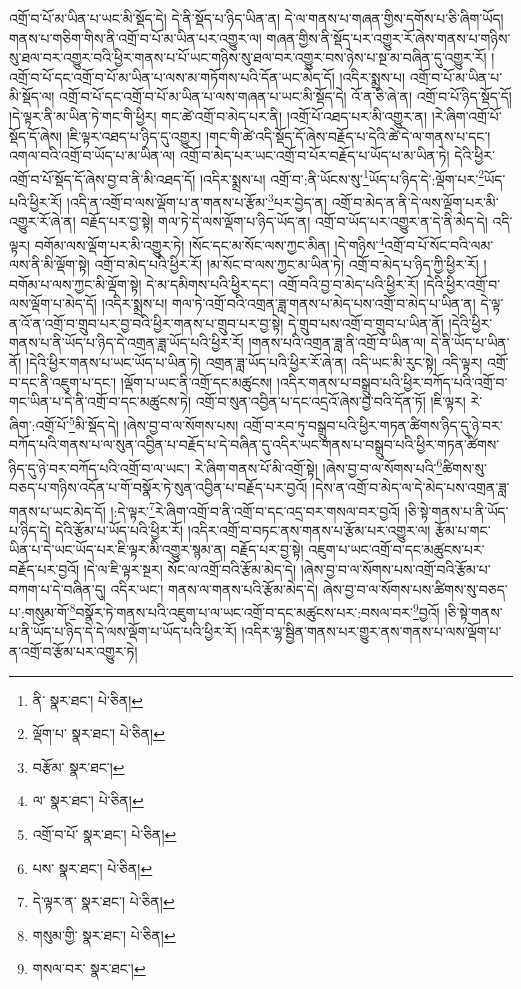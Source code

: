 འགྲོ་བ་པོ་མ་ཡིན་པ་ཡང་མི་སྡོད་དེ། དེ་ནི་སྡོད་པ་ཉིད་ཡིན་ན། དེ་ལ་གནས་པ་གཞན་གྱིས་དགོས་པ་ཅི་ཞིག་ཡོད། གནས་པ་གཅིག་གིས་ནི་འགྲོ་བ་པོ་མ་ཡིན་པར་འགྱུར་ལ། གཞན་གྱིས་ནི་སྡོད་པར་འགྱུར་རོ་ཞེས་གནས་པ་གཉིས་སུ་ཐལ་བར་འགྱུར་བའི་ཕྱིར་གནས་པ་པོ་ཡང་གཉིས་སུ་ཐལ་བར་འགྱུར་བས་ཉེས་པ་སྔ་མ་བཞིན་དུ་འགྱུར་རོ། །འགྲོ་བ་པོ་དང་འགྲོ་བ་པོ་མ་ཡིན་པ་ལས་མ་གཏོགས་པའི་དོན་ཡང་མེད་དོ། །འདིར་སྨྲས་པ། འགྲོ་བ་པོ་མ་ཡིན་པ་མི་སྡོད་ལ། འགྲོ་བ་པོ་དང་འགྲོ་བ་པོ་མ་ཡིན་པ་ལས་གཞན་པ་ཡང་མི་སྡོད་དེ། འོ་ན་ཅི་ཞེ་ན། འགྲོ་བ་པོ་ཉིད་སྡོད་དོ། །དེ་ལྟར་ནི་མ་ཡིན་ཏེ་གང་གི་ཕྱིར། གང་ཚེ་འགྲོ་བ་མེད་པར་ནི། །འགྲོ་པོ་འཐད་པར་མི་འགྱུར་ན། །རེ་ཞིག་འགྲོ་པོ་སྡོད་དོ་ཞེས། །ཇི་ལྟར་འཐད་པ་ཉིད་དུ་འགྱུར། །གང་གི་ཚེ་འདི་སྡོད་དོ་ཞེས་བརྗོད་པ་དེའི་ཚེ་དེ་ལ་གནས་པ་དང་། འགལ་བའི་འགྲོ་བ་ཡོད་པ་མ་ཡིན་ལ། འགྲོ་བ་མེད་པར་ཡང་འགྲོ་བ་པོར་བརྗོད་པ་ཡོད་པ་མ་ཡིན་ཏེ། དེའི་ཕྱིར་འགྲོ་བ་པོ་སྡོད་དོ་ཞེས་བྱ་བ་ནི་མི་འཐད་དོ། །འདིར་སྨྲས་པ། འགྲོ་བ་:ནི་ཡོངས་སུ་\footnote{ནི་  སྣར་ཐང་།  པེ་ཅིན། }ཡོད་པ་ཉིད་དེ་:ལྡོག་པར་\footnote{ལྡོག་པ་  སྣར་ཐང་།  པེ་ཅིན། }ཡོད་པའི་ཕྱིར་རོ། །འདི་ན་འགྲོ་བ་ལས་ལྡོག་པ་ན་གནས་པ་རྩོམ་\footnote{བརྩོམ་  སྣར་ཐང་། }པར་བྱེད་ན། འགྲོ་བ་མེད་ན་ནི་དེ་ལས་ལྡོག་པར་མི་འགྱུར་རོ་ཞེ་ན། བརྗོད་པར་བྱ་སྟེ། གལ་ཏེ་དེ་ལས་ལྡོག་པ་ཉིད་ཡོད་ན། འགྲོ་བ་ཡོད་པར་འགྱུར་ན་དེ་ནི་མེད་དེ། འདི་ལྟར། བགོམ་ལས་ལྡོག་པར་མི་འགྱུར་ཏེ། །སོང་དང་མ་སོང་ལས་ཀྱང་མིན། །དེ་གཉིས་\footnote{ལ་  སྣར་ཐང་།  པེ་ཅིན། }འགྲོ་བ་པོ་སོང་བའི་ལམ་ལས་ནི་མི་ལྡོག་སྟེ། འགྲོ་བ་མེད་པའི་ཕྱིར་རོ། །མ་སོང་བ་ལས་ཀྱང་མ་ཡིན་ཏེ། འགྲོ་བ་མེད་པ་ཉིད་ཀྱི་ཕྱིར་རོ། །བགོམ་པ་ལས་ཀྱང་མི་ལྡོག་སྟེ། དེ་མ་དམིགས་པའི་ཕྱིར་དང་། འགྲོ་བའི་བྱ་བ་མེད་པའི་ཕྱིར་རོ། །དེའི་ཕྱིར་འགྲོ་བ་ལས་ལྡོག་པ་མེད་དོ། །འདིར་སྨྲས་པ། གལ་ཏེ་འགྲོ་བའི་འགྲན་ཟླ་གནས་པ་མེད་པས་འགྲོ་བ་མེད་པ་ཡིན་ན། དེ་ལྟ་ན་འོ་ན་འགྲོ་བ་གྲུབ་པར་བྱ་བའི་ཕྱིར་གནས་པ་གྲུབ་པར་བྱ་སྟེ། དེ་གྲུབ་པས་འགྲོ་བ་གྲུབ་པ་ཡིན་ནོ། །དེའི་ཕྱིར་གནས་པ་ནི་ཡོད་པ་ཉིད་དེ་འགྲན་ཟླ་ཡོད་པའི་ཕྱིར་རོ། །གནས་པའི་འགྲན་ཟླ་ནི་འགྲོ་བ་ཡིན་ལ། དེ་ནི་ཡོད་པ་ཡིན་ནོ། །དེའི་ཕྱིར་གནས་པ་ཡང་ཡོད་པ་ཡིན་ཏེ། འགྲན་ཟླ་ཡོད་པའི་ཕྱིར་རོ་ཞེ་ན། འདི་ཡང་མི་རུང་སྟེ། འདི་ལྟར། འགྲོ་བ་དང་ནི་འཇུག་པ་དང་། །ལྡོག་པ་ཡང་ནི་འགྲོ་དང་མཚུངས། །འདིར་གནས་པ་བསྒྲུབ་པའི་ཕྱིར་བཀོད་པའི་འགྲོ་བ་གང་ཡིན་པ་དེ་ནི་འགྲོ་བ་དང་མཚུངས་ཏེ། འགྲོ་བ་སུན་འབྱིན་པ་དང་འདྲའོ་ཞེས་བྱ་བའི་དོན་ཏོ། །ཇི་ལྟར། རེ་ཞིག་:འགྲོ་པོ་\footnote{འགྲོ་བ་པོ་  སྣར་ཐང་།  པེ་ཅིན། }མི་སྡོད་དེ། །ཞེས་བྱ་བ་ལ་སོགས་པས། འགྲོ་བ་རབ་ཏུ་བསྒྲུབ་པའི་ཕྱིར་གཏན་ཚིགས་ཉིད་དུ་ཉེ་བར་བཀོད་པའི་གནས་པ་ལ་སུན་འབྱིན་པ་བརྗོད་པ་དེ་བཞིན་དུ་འདིར་ཡང་གནས་པ་བསྒྲུབ་པའི་ཕྱིར་གཏན་ཚིགས་ཉིད་དུ་ཉེ་བར་བཀོད་པའི་འགྲོ་བ་ལ་ཡང་། རེ་ཞིག་གནས་པོ་མི་འགྲོ་སྟེ། །ཞེས་བྱ་བ་ལ་སོགས་པའི་\footnote{པས་  སྣར་ཐང་།  པེ་ཅིན། }ཚིགས་སུ་བཅད་པ་གཉིས་འདོན་པ་གོ་བསྣོར་ཏེ་སུན་འབྱིན་པ་བརྗོད་པར་བྱའོ། །དེས་ན་འགྲོ་བ་མེད་ལ་དེ་མེད་པས་འགྲན་ཟླ་གནས་པ་ཡང་མེད་དོ། །:དེ་ལྟར་\footnote{དེ་ལྟར་ན་  སྣར་ཐང་།  པེ་ཅིན། }རེ་ཞིག་འགྲོ་བ་ནི་འགྲོ་བ་དང་འདྲ་བར་གསལ་བར་བྱའོ། །ཅི་སྟེ་གནས་པ་ནི་ཡོད་པ་ཉིད་དེ། དེའི་རྩོམ་པ་ཡོད་པའི་ཕྱིར་རོ། །འདིར་འགྲོ་བ་བཏང་ནས་གནས་པ་རྩོམ་པར་འགྱུར་ལ། རྩོམ་པ་གང་ཡིན་པ་དེ་ཡང་ཡོད་པར་ཇི་ལྟར་མི་འགྱུར་སྙམ་ན། བརྗོད་པར་བྱ་སྟེ། འཇུག་པ་ཡང་འགྲོ་བ་དང་མཚུངས་པར་བརྗོད་པར་བྱའོ། །དེ་ལ་ཇི་ལྟར་སྔར། སོང་ལ་འགྲོ་བའི་རྩོམ་མེད་དེ། །ཞེས་བྱ་བ་ལ་སོགས་པས་འགྲོ་བའི་རྩོམ་པ་བཀག་པ་དེ་བཞིན་དུ། འདིར་ཡང་། གནས་ལ་གནས་པའི་རྩོམ་མེད་དེ། ཞེས་བྱ་བ་ལ་སོགས་པས་ཚིགས་སུ་བཅད་པ་:གསུམ་གོ་\footnote{གསུམ་གྱི་  སྣར་ཐང་།  པེ་ཅིན། }བསྣོར་ཏེ་གནས་པའི་འཇུག་པ་ལ་ཡང་འགྲོ་བ་དང་མཚུངས་པར་:བསལ་བར་\footnote{གསལ་བར་  སྣར་ཐང་། }བྱའོ། །ཅི་སྟེ་གནས་པ་ནི་ཡོད་པ་ཉིད་དེ་དེ་ལས་ལྡོག་པ་ཡོད་པའི་ཕྱིར་རོ། །འདིར་ལྷ་སྦྱིན་གནས་པར་གྱུར་ནས་གནས་པ་ལས་ལྡོག་པ་ན་འགྲོ་བ་རྩོམ་པར་འགྱུར་ཏེ། 